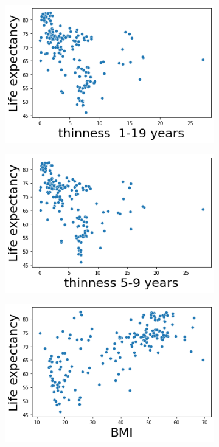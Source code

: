 \begin{itemize}
          \begin{figure}[H]
            \centering
              \begin{subfigure}{0.2\linewidth}
                \centering
                \includegraphics[width=\textwidth]{img/30.png}
              \end{subfigure}
              \hfill
                \begin{subfigure}{0.2\linewidth}
                \centering
                \includegraphics[width=\textwidth]{img/31.png}
              \end{subfigure}
              \hfill
                \begin{subfigure}{0.2\linewidth}
                \centering
                \includegraphics[width=\textwidth]{img/32.png}

\end{subfigure}
\end{figure}
\end{itemize}
